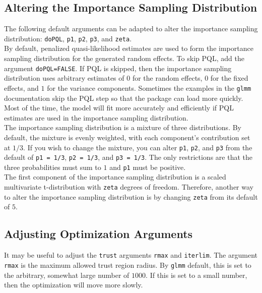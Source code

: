 \documentclass[11pt]{article}\usepackage[]{graphicx}\usepackage[]{color}
\begin{document}
\subsection{Altering the Importance Sampling Distribution}
The following default arguments can be adapted to alter the importance sampling distribution: \texttt{doPQL}, \texttt{p1}, \texttt{p2}, \texttt{p3}, and \texttt{zeta}.\\

By default, penalized quasi-likelihood estimates are used to form the importance sampling distribution for the generated random effects.  To skip PQL, add the argument \texttt{doPQL=FALSE}. If PQL is skipped, then the importance sampling distribution uses arbitrary estimates of $0$ for the random effects, $0$ for the fixed effects, and $1$ for the variance components. Sometimes the examples in the \texttt{glmm} documentation  skip the PQL step so that the package can load more quickly. Most of the time, the model will fit more accurately and efficiently if PQL estimates are used in the importance sampling distribution.\\

The importance sampling distribution is a mixture of three distributions. By default, the mixture is evenly weighted, with each component's contribution set at $1/3$. If you wish to change the mixture, you can alter \texttt{p1}, \texttt{p2}, and \texttt{p3} from the default of  \texttt{p1 = 1/3}, \texttt{p2 = 1/3}, and \texttt{p3 = 1/3}. The only restrictions are that the three probabilities must sum to $1$ and \texttt{p1} must be positive.\\

 The first component of the importance sampling distribution is a scaled multivariate t-distribution with \texttt{zeta} degrees of freedom. Therefore, another way to alter the importance sampling distribution is by changing \texttt{zeta} from its default of $5$.\\

\subsection{Adjusting Optimization Arguments}
It may be useful to adjust the \texttt{trust} arguments \texttt{rmax} and \texttt{iterlim}. The argument \texttt{rmax} is the maximum allowed trust region radius. By \texttt{glmm} default, this is set to the arbitrary, somewhat large number of $1000$. If this is set to a small number, then the optimization will move more slowly.\\
\end{document}
